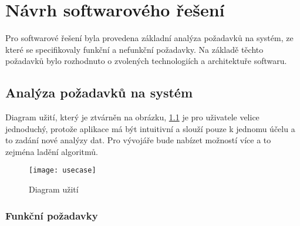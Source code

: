 \chapter{Návrh softwarového řešení}
Pro softwarové řešení byla provedena základní analýza požadavků na systém, ze které se specifikovaly funkční a nefunkční požadavky. Na základě těchto požadavků bylo rozhodnuto o zvolených technologiích a architektuře softwaru.
\section{Analýza požadavků na systém}
Diagram užití, který je ztvárněn na obrázku, \ref{fig:usecase} je pro uživatele velice jednoduchý, protože aplikace má být intuitivní a slouží pouze k jednomu účelu a to zadání nové analýzy dat. Pro vývojáře bude nabízet možností více a to zejména ladění algoritmů.

\begin{figure}[h]
	\texttt{[image: usecase]}
	\centering
	\caption{Diagram užití \label{fig:usecase}}
\end{figure} 

\subsection{Funkční požadavky}

